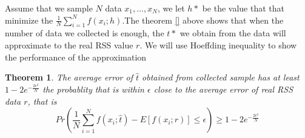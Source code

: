 \documentclass[10pt,conference,compsocconf,letterpaper]{IEEEtran}
\newtheorem{theorem}{Theorem}
\begin{document}
Assume that we sample $N$ data $x_1,...,x_N$, we let $h*$ be the value that that minimize the $\frac{1}{N}\sum_{i=1}^N f(x_i;h)$.The theorem \ref{} above shows that when the number of data we collected is enough, the $t*$ we obtain from the data will approximate to the real RSS value $r$. We will use Hoeffding inequality to show the performance of the approximation
\begin{theorem}
The average error of $\hat{t}$ obtained from collected sample has at least $1-2e^{-\frac{2\epsilon^2}{N}}$ the probablity that is within $\epsilon$ close to the average error of real RSS data $r$, that is
\begin{equation}
Pr(\frac{1}{N}\sum_{i=1}^Nf(x_i;\hat{t})-E[f(x_i;r)]\leq\epsilon)\geq1-2e^{-\frac{2\epsilon^2}{N}}
\end{equation}
\end{theorem}
\end{document}

